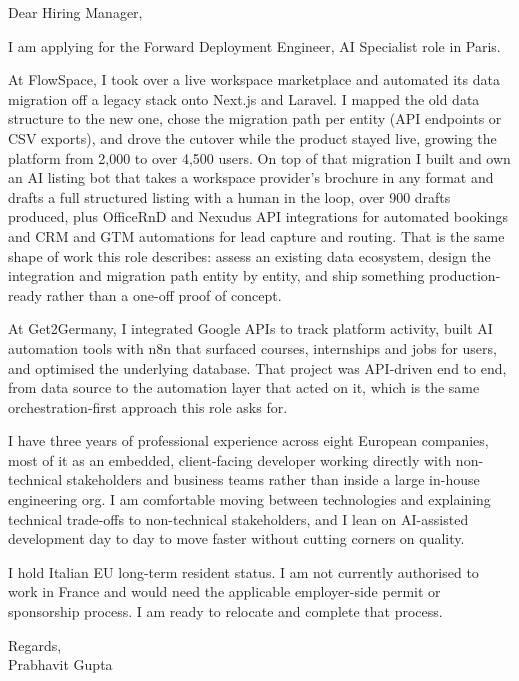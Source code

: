 \documentclass[a4paper,11pt]{article}
\begin{document}
Dear Hiring Manager,

I am applying for the Forward Deployment Engineer, AI Specialist role in Paris.

At FlowSpace, I took over a live workspace marketplace and automated its data migration off a legacy stack onto Next.js and Laravel. I mapped the old data structure to the new one, chose the migration path per entity (API endpoints or CSV exports), and drove the cutover while the product stayed live, growing the platform from 2,000 to over 4,500 users. On top of that migration I built and own an AI listing bot that takes a workspace provider's brochure in any format and drafts a full structured listing with a human in the loop, over 900 drafts produced, plus OfficeRnD and Nexudus API integrations for automated bookings and CRM and GTM automations for lead capture and routing. That is the same shape of work this role describes: assess an existing data ecosystem, design the integration and migration path entity by entity, and ship something production-ready rather than a one-off proof of concept.

At Get2Germany, I integrated Google APIs to track platform activity, built AI automation tools with n8n that surfaced courses, internships and jobs for users, and optimised the underlying database. That project was API-driven end to end, from data source to the automation layer that acted on it, which is the same orchestration-first approach this role asks for.

I have three years of professional experience across eight European companies, most of it as an embedded, client-facing developer working directly with non-technical stakeholders and business teams rather than inside a large in-house engineering org. I am comfortable moving between technologies and explaining technical trade-offs to non-technical stakeholders, and I lean on AI-assisted development day to day to move faster without cutting corners on quality.

I hold Italian EU long-term resident status. I am not currently authorised to work in France and would need the applicable employer-side permit or sponsorship process. I am ready to relocate and complete that process.

Regards,\\
Prabhavit Gupta
\end{document}
